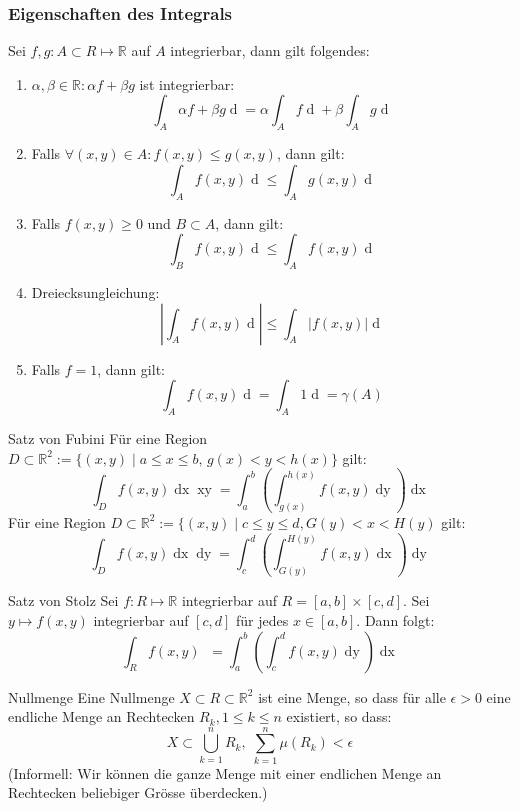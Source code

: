 \documentclass[a4paper,10pt]{article}
\def\R{\mathbb{R}}
\begin{document}
\subsubsection*{Eigenschaften des Integrals}
Sei \(f,g : A \subset R \mapsto \R\) auf \(A\) integrierbar, dann gilt folgendes:
\begin{enumerate}
  \item \(\alpha, \beta \in \R: \alpha f + \beta g\) ist integrierbar:
  \[\int_A \alpha f + \beta g \mathop{d(x,y)} = \alpha \int_A f \mathop{d(x,y)} + \beta \int_A g \mathop{d(x,y)}\]
  \item Falls \(\forall (x,y) \in A: f(x,y) \le g(x,y)\), dann gilt:
  \[\int_A f(x,y) \mathop{d(x,y)} \le \int_A g(x,y) \mathop{d(x,y)}\]
  \item Falls \(f(x,y) \ge 0\) und \(B \subset A\), dann gilt:
  \[\int_B f(x,y) \mathop{d(x,y)} \le \int_A f(x,y) \mathop{d(x,y)}\]
  \item Dreiecksungleichung:
    \[\left| \int_A f(x,y) \mathop{d(x,y)}\right| \le \int_A \left|f(x,y)\right| \mathop{d(x,y)}\]
  \item Falls \(f = 1\), dann gilt:
  \[\int_A f(x,y) \mathop{d(x,y)} = \int_A 1 \mathop{d(x,y)} = \gamma(A)\]
\end{enumerate}


\begin{mainbox}{Satz von Fubini}
  Für eine Region \(D \subset \R^2 := \{\left(x,y\right) \mid a \le x \le b,\, g(x) < y < h(x)\}\) gilt:
  \[\int_D f(x,y)\mathop{dx} \mathop{xy} = \int_a^b \left(\int_{g(x)}^{h(x)} f(x,y) \mathop{dy}\right)\mathop{dx}\]
  Für eine Region \(D \subset \R^2 := \{ \left(x,y\right) \mid c \le y \le d, G(y) < x < H(y)\) gilt:
  \[\int_D f(x,y) \mathop{dx} \mathop{dy} = \int_c^d \left(\int_{G(y)}^{H(y)} f(x,y)\mathop{dx}\right) \mathop{dy}\]
\end{mainbox}
\begin{subbox}{Satz von Stolz}
  Sei \(f: R \mapsto \R\) integrierbar auf \(R = \left[a,b\right] \times \left[c,d\right]\). Sei \(y \mapsto f(x,y)\) integrierbar auf \(\left[c,d\right]\) für jedes \(x \in \left[a,b\right]\). Dann folgt:
  \[\int_R f(x,y) \mathop(d(x,y)) = \int_a^b \left(\int_c^d f(x,y) \mathop{dy}\right) \mathop{dx}\]
\end{subbox}
\begin{mainbox}{Nullmenge}
  Eine Nullmenge \(X \subset R \subset \R^2\) ist eine Menge, so dass für alle \(\epsilon > 0\) eine endliche Menge an Rechtecken \(R_k, 1 \le k \le n\) existiert, so dass:
  \[X \subset \bigcup_{k = 1}^n R_k, \; \sum_{k = 1}^n \mu (R_k) < \epsilon\]
  (Informell: Wir können die ganze Menge mit einer endlichen Menge an Rechtecken beliebiger Grösse überdecken.)
\end{mainbox}
\end{document}
